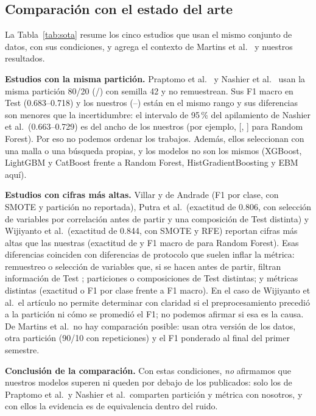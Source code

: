 \documentclass[conference]{IEEEtran}
\newcommand{\Fm}{F1 macro}
\begin{document}


\subsection{Comparación con el estado del arte}\label{sec:sota}
La Tabla~\ref{tab:sota} resume los cinco estudios que usan el mismo conjunto de datos, con sus condiciones, y agrega el contexto de Martins et al.\ \cite{martins2023} y nuestros resultados.



\textbf{Estudios con la misma partición.} Praptomo et al.\ \cite{praptomo2026} y Nashier et al.\ \cite{nashier2026} usan la misma partición 80/20 (\Ntr{}/\Nte{}) con semilla 42 y no remuestrean. Sus F1 macro en Test (0.683--0.718) y los nuestros (\testFMin{}--\testFMax{}) están en el mismo rango y sus diferencias son menores que la incertidumbre: el intervalo de 95\,\% del apilamiento de Nashier et al.\ (0.663--0.729) es del ancho de los nuestros (por ejemplo, [\teLoRF, \teHiRF] para Random Forest). Por eso no podemos ordenar los trabajos. Además, ellos seleccionan con una malla o una búsqueda propias, y los modelos no son los mismos (XGBoost, LightGBM y CatBoost frente a Random Forest, HistGradientBoosting y EBM aquí).

\textbf{Estudios con cifras más altas.} Villar y de Andrade (F1 por clase, con SMOTE y partición no reportada), Putra et al.\ (exactitud de 0.806, con selección de variables por correlación antes de partir y una composición de Test distinta) y Wijiyanto et al.\ (exactitud de 0.844, con SMOTE y RFE) reportan cifras más altas que las nuestras (exactitud de \teAccRF{} y \Fm{} de \teFRF{} para Random Forest). Esas diferencias coinciden con diferencias de protocolo que suelen inflar la métrica: remuestreo o selección de variables que, si se hacen antes de partir, filtran información de Test \cite{kapoor2023}; particiones o composiciones de Test distintas; y métricas distintas (exactitud o F1 por clase frente a F1 macro). En el caso de Wijiyanto et al.\ el artículo no permite determinar con claridad si el preprocesamiento precedió a la partición ni cómo se promedió el F1; no podemos afirmar si esa es la causa. De Martins et al.\ no hay comparación posible: usan otra versión de los datos, otra partición (90/10 con repeticiones) y el F1 ponderado al final del primer semestre.

\textbf{Conclusión de la comparación.} Con estas condiciones, \emph{no} afirmamos que nuestros modelos superen ni queden por debajo de los publicados: solo los de Praptomo et al.\ y Nashier et al.\ comparten partición y métrica con nosotros, y con ellos la evidencia es de equivalencia dentro del ruido.
\end{document}
